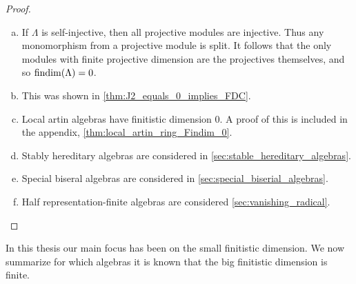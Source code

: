 \begin{theorem}
\begin{proof}
\begin{enumerate}[(a)]
			\item If $\Lambda$ is self-injective, then all projective modules are injective. Thus any monomorphism from a projective module is split. It follows that the only modules with finite projective dimension are the projectives themselves, and so $\operatorname{findim}(\Lambda)=0$.
			\item This was shown in \cref{thm:J2_equals_0_implies_FDC}.
			\item Local artin algebras have finitistic dimension 0. A proof of this is included in the appendix, \cref{thm:local_artin_ring_Findim_0}.
			\item Stably hereditary algebras are considered in \cref{sec:stable_hereditary_algebras}.
			\item Special biseral algebras are considered in \cref{sec:special_biserial_algebras}.
			\item Half representation-finite algebras are considered \cref{sec:vanishing_radical}.
		\end{enumerate}
	\end{proof}
\end{theorem}

In this thesis our main focus has been on the small finitistic dimension. We now summarize for which algebras it is known that the big finitistic dimension is finite.

